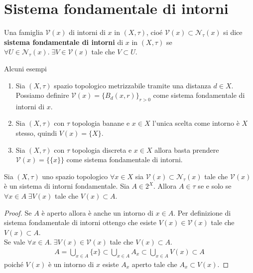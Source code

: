 \section{Sistema fondamentale di intorni}

\begin{definition}
	Una famiglia $\mathcal{V}(x)$ di intorni di $x$ in $(X,\tau)$, cioé $\mathcal{V}(x) \subset \mathcal{N}_\tau(x)$ si dice \textbf{sistema fondamentale di intorni} di $x$ in $(X,\tau)$ se $\forall U \in \mathcal{N}_\tau(x) . \; \exists V \in \mathcal{V}(x)$ tale che $V \subset U$.
\end{definition}
Alcuni esempi
\begin{enumerate}
	\item Sia $(X,\tau)$ spazio topologico metrizzabile tramite una distanza $d \in X$. Possiamo definire $\mathcal{V}(x) = \{B_d(x,r)\}_{r>0}$ come sistema fondamentale di intorni di $x$. 
	\item Sia $(X,\tau)$ con $\tau$ topologia banane e $x \in X$ l'unica scelta come intorno è $X$ stesso, quindi $V(x) = \{X\}$.
	\item Sia $(X,\tau)$ con $\tau$ topologia discreta e $x \in X$ allora basta prendere $\mathcal{V}(x) = \{\{x\}\}$ come sistema fondamentale di intorni.
\end{enumerate}

\begin{proposition}
	Sia $(X,\tau)$ uno spazio topologico $\forall x \in X$ sia $\mathcal{V}(x) \subset \mathcal{N}_\tau(x)$ tale che $\mathcal{V}(x)$ è un sistema di intorni fondamentale. Sia $A \in 2^X$. Allora $A \in \tau$ se e solo se $\forall x \in A \; \exists V(x)$ tale che $V(x) \subset A$.
\end{proposition}
\begin{proof}
	Se $A$ è aperto allora è anche un intorno di $x \in A$. Per definizione di sistema fondamentale di intorni ottengo che esiste $V(x) \in \mathcal{V}(x)$ tale che $V(x) \subset A$.\\
	
	Se vale $\forall x \in A . \; \exists V(x) \in \mathcal{V}(x)$ tale che $V(x) \subset A$. 
	\begin{equation}
	\begin{aligned}
		A = \bigcup_{x \in A} \{x\} \subset \bigcup_{x \in A} A_x \subset \bigcup_{x \in A} V(x) \subset A
	\end{aligned}
	\end{equation}
	poiché $V(x)$ è un intorno di $x$ esiste $A_x$ aperto tale che $A_x \subset V(x)$.
\end{proof}


